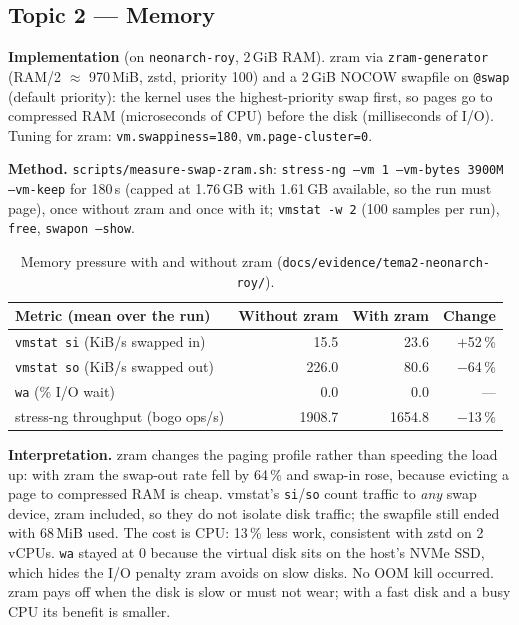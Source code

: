 \documentclass[10.5pt,a4paper]{article}
\newcommand{\cmd}[1]{\texttt{#1}}
\begin{document}
\subsection{Topic 2 — Memory}
\textbf{Implementation} (on \cmd{neonarch-roy}, 2\,GiB RAM). zram via \cmd{zram-generator} (RAM/2 $\approx$ 970\,MiB, zstd, priority 100) and a 2\,GiB NOCOW swapfile on \cmd{@swap} (default priority): the kernel uses the highest-priority swap first, so pages go to compressed RAM (microseconds of CPU) before the disk (milliseconds of I/O). Tuning for zram: \cmd{vm.swappiness=180}, \cmd{vm.page-cluster=0}.

\textbf{Method.} \cmd{scripts/measure-swap-zram.sh}: \cmd{stress-ng --vm 1 --vm-bytes 3900M --vm-keep} for 180\,s (capped at 1.76\,GB with 1.61\,GB available, so the run must page), once without zram and once with it; \cmd{vmstat -w 2} (100 samples per run), \cmd{free}, \cmd{swapon --show}.

\begin{table}[H]
\centering\small
\begin{tabular}{@{}lrrr@{}}
\toprule
Metric (mean over the run) & Without zram & With zram & Change\\ \midrule
\cmd{vmstat si} (KiB/s swapped in) & 15.5 & 23.6 & +52\,\%\\
\cmd{vmstat so} (KiB/s swapped out) & 226.0 & 80.6 & $-$64\,\%\\
\cmd{wa} (\% I/O wait) & 0.0 & 0.0 & —\\
stress-ng throughput (bogo ops/s) & 1908.7 & 1654.8 & $-$13\,\%\\
\bottomrule
\end{tabular}
\caption{Memory pressure with and without zram (\cmd{docs/evidence/tema2-neonarch-roy/}).}
\end{table}

\textbf{Interpretation.} zram changes the paging profile rather than speeding the load up: with zram the swap-out rate fell by 64\,\% and swap-in rose, because evicting a page to compressed RAM is cheap. vmstat's \cmd{si}/\cmd{so} count traffic to \emph{any} swap device, zram included, so they do not isolate disk traffic; the swapfile still ended with 68\,MiB used. The cost is CPU: 13\,\% less work, consistent with zstd on 2 vCPUs. \cmd{wa} stayed at 0 because the virtual disk sits on the host's NVMe SSD, which hides the I/O penalty zram avoids on slow disks. No OOM kill occurred. zram pays off when the disk is slow or must not wear; with a fast disk and a busy CPU its benefit is smaller.
\end{document}
